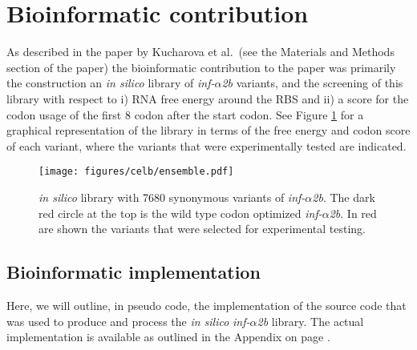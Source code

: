 \section{Bioinformatic contribution}
As described in the paper by Kucharova et al.\ (see the Materials and Methods
section of the paper) the bioinformatic contribution to the paper was primarily
the construction an \textit{in silico} library of \textit{inf-$\alpha$2b}
variants, and the screening of this library with respect to i) RNA free energy
around the RBS and ii) a score for the codon usage of the first 8 codon after
the start codon. See Figure \ref{fig:ensemble} for a graphical representation of
the library in terms of the free energy and codon score of each variant, where
the variants that were experimentally tested are indicated.

\begin{figure}[b]
	\begin{center}
		\texttt{[image: figures/celb/ensemble.pdf]}
	\end{center}
	\caption{\textit{in silico} library with 7680 synonymous variants of
	\textit{inf-$\alpha$2b}. The dark red circle at the top is the wild type codon
	optimized \textit{inf-$\alpha$2b}. In red are shown the variants that were
	selected for experimental testing.}
	\label{fig:ensemble}
\end{figure}

\subsection{Bioinformatic implementation}
Here, we will outline, in pseudo code, the implementation of the source code
that was used to produce and process the \textit{in silico}
\textit{inf-$\alpha$2b} library. The actual implementation is available as
outlined in the Appendix on page \pageref{source_code}.

\inputminted[fontsize=\small]{python}{pseudo_code/pseudo_code.py}
